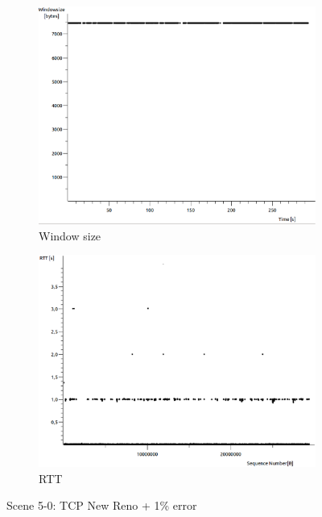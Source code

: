 \documentclass[conference,a4paper]{../../sty/IEEEtran}
\begin{document}
\begin{figure}
\begin{subfigure}[b]{0.2\textwidth}
  \includegraphics[width=\textwidth]{s5-0_wsize}
  \caption{Window size}
 \end{subfigure}
 \begin{subfigure}[b]{0.2\textwidth}
  \includegraphics[width=\textwidth]{s5-0_rtt}
  \caption{RTT}
 \end{subfigure}
 \caption{Scene 5-0: TCP New Reno + 1\% error}
\end{figure}
\end{document}
